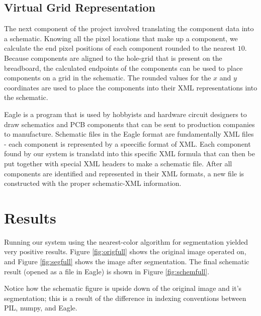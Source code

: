 \documentclass[10pt,twocolumn,letterpaper]{article}
\begin{document}
\subsection{Virtual Grid Representation}

The next component of the project involved translating the component data into
a schematic. Knowing all the pixel locations that make up a component, we
calculate the end pixel positions of each component rounded to the nearest
$10$. Because components are aligned to the hole-grid that is present on the
breadboard, the calculated endpoints of the components can be used to place
components on a grid in the schematic. The rounded values for the $x$ and $y$
coordinates are used to place the components into their XML representations
into the schematic. 

Eagle is a program that is used by hobbyists and hardware circuit designers to
draw schematics and PCB components that can be sent to production companies to
manufacture. Schematic files in the Eagle format are fundamentally XML files -
each component is represented by a speecific format of XML. Each component
found by our system is translatd into this specific XML formula that can then
be put together with special XML headers to make a schematic file. After all
components are identified and represented in their XML formats, a new file is
constructed with the proper schematic-XML information.    

\section{Results}

Running our system using the nearest-color algorithm for segmentation yielded
very positive results. Figure \ref{fig:origfull} shows the original image
operated on, and Figure \ref{fig:segfull} shows the image after
segmentation. The final schematic result (opened as a file in Eagle) is shown
in Figure \ref{fig:schemfull}. 

Notice how the schematic figure is upside down of the original image and it's
segmentation; this is a result of the difference in indexing conventions
between PIL, numpy, and Eagle.
\end{document}
